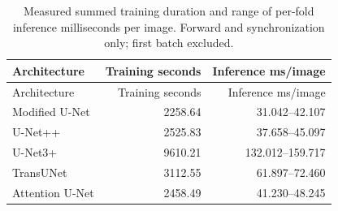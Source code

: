 \small
\begin{longtable}{lrr}
\caption{Measured summed training duration and range of per-fold inference milliseconds per image. Forward and synchronization only; first batch excluded.}\\
\toprule
Architecture & Training seconds & Inference ms/image\\\midrule
\endfirsthead
\toprule
Architecture & Training seconds & Inference ms/image\\\midrule
\endhead
Modified U-Net & 2258.64 & 31.042--42.107\\
U-Net++ & 2525.83 & 37.658--45.097\\
U-Net3+ & 9610.21 & 132.012--159.717\\
TransUNet & 3112.55 & 61.897--72.460\\
Attention U-Net & 2458.49 & 41.230--48.245\\
\bottomrule\end{longtable}\normalsize
